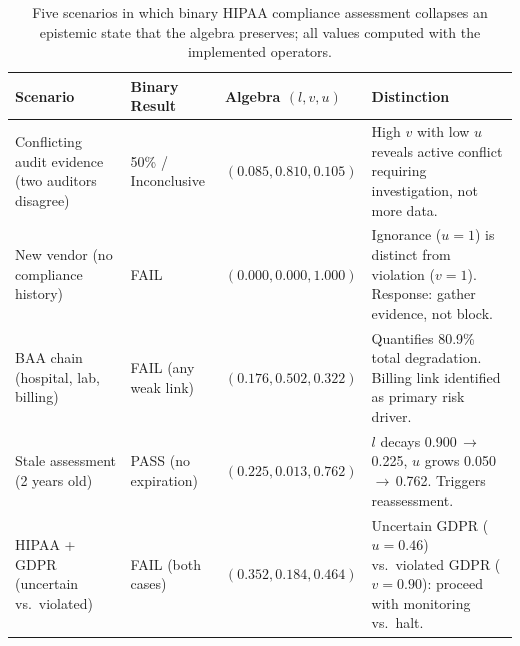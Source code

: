 
\begin{table}[t]
\centering
\caption{Five scenarios in which binary HIPAA compliance assessment collapses an epistemic state that the algebra preserves; all values computed with the implemented operators.}
\label{tab:binary_scenarios}
\footnotesize
\begin{tabular}{@{}p{3.6cm}p{2.4cm}p{2.8cm}p{7.7cm}@{}}
\toprule
Scenario & Binary Result & Algebra $(l, v, u)$ & Distinction \\
\midrule
Conflicting audit evidence (two auditors disagree)
  & 50\% / Inconclusive
  & $(0.085, 0.810, 0.105)$
  & High $v$ with low $u$ reveals active conflict requiring investigation, not more data. \\[2pt]
New vendor (no compliance history)
  & FAIL
  & $(0.000, 0.000, 1.000)$
  & Ignorance ($u\!=\!1$) is distinct from violation ($v\!=\!1$). Response: gather evidence, not block. \\[2pt]
BAA chain (hospital, lab, billing)
  & FAIL (any weak link)
  & $(0.176, 0.502, 0.322)$
  & Quantifies 80.9\% total degradation. Billing link identified as primary risk driver. \\[2pt]
Stale assessment (2 years old)
  & PASS (no expiration)
  & $(0.225, 0.013, 0.762)$
  & $l$ decays 0.900\,$\to$\,0.225, $u$ grows 0.050\,$\to$\,0.762. Triggers reassessment. \\[2pt]
HIPAA + GDPR (uncertain vs.\ violated)
  & FAIL (both cases)
  & $(0.352, 0.184, 0.464)$
  & Uncertain GDPR ($u\!=\!0.46$) vs.\ violated GDPR ($v\!=\!0.90$): proceed with monitoring vs.\ halt. \\
\bottomrule
\end{tabular}
\end{table}
